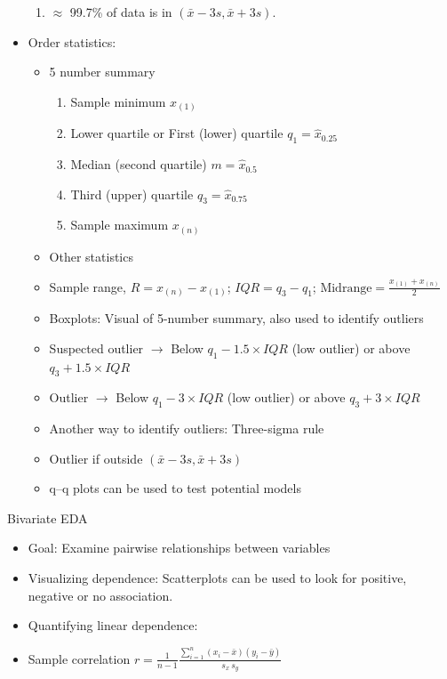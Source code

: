 \documentclass{article}
\newcommand{\order}[2]{#1_{(#2)}}		%
\begin{document}
\begin{itemize}
\begin{enumerate}
        \item $\approx$ 99.7\% of data is in $(\bar{x} - 3s, \bar{x} + 3s)$.
    \end{enumerate}
    \item Order statistics:
    \begin{itemize}
        \item 5 number summary
        \begin{enumerate}
            \item Sample minimum $\order{x}{1}$
            \item Lower quartile or First (lower) quartile $q_1 = \hat{x}_{0.25}$
            \item Median (second quartile) $m = \hat{x}_{0.5}$
            \item Third (upper) quartile $q_3 = \hat{x}_{0.75}$
            \item Sample maximum $\order{x}{n}$
        \end{enumerate}
        \item Other statistics
        \item[] Sample range, $R = \order{x}{n} - \order{x}{1}$; \hspace{10pt} $IQR = q_3 - q_1$; \hspace{10pt} $\displaystyle \text{Midrange} = \frac{\order{x}{1} + \order{x}{n}}{2}$
        \item Boxplots: Visual of 5-number summary, also used to identify outliers
        \item[] Suspected outlier $\rightarrow$ Below $q_1 - 1.5 \times IQR$ (low outlier) or above $q_3 +1.5 \times IQR$
        \item[] Outlier $\rightarrow$ Below $q_1 - 3 \times IQR$ (low outlier) or above $q_3 +3 \times IQR$
        \item Another way to identify outliers: Three-sigma rule
        \item[] Outlier if outside $(\bar{x} - 3s, \bar{x} + 3s)$
        \item q--q plots can be used to test potential models
    \end{itemize}
\end{itemize}\bigskip

Bivariate EDA
\begin{itemize}
    \item Goal: Examine pairwise relationships between variables
    \item Visualizing dependence: Scatterplots can be used to look for positive, negative or no association.
    \item Quantifying linear dependence:
    \item[] Sample correlation $\displaystyle r = \frac{1}{n - 1} \frac{\sum_{i = 1}^n (x_i - \bar{x})(y_i - \bar{y})}{s_x \, s_y}$
\end{itemize} 
\end{document}
